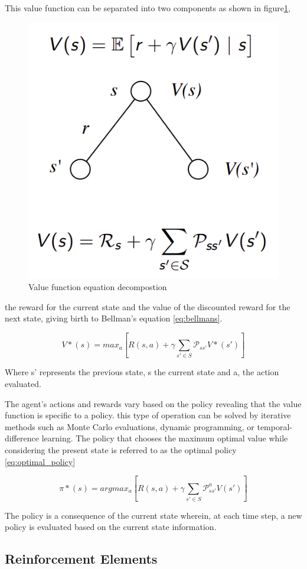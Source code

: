 This value function can be separated into two components as shown in figure\ref{fig:bellman}, 

\begin{figure}[!h]
    \centering
    \includegraphics[width=.4\textwidth]{fig/rl/Bellmans decomposition.png}
    \caption{Value function equation decompostion}
    \label{fig:bellman}
\end{figure}

the reward for the current state and the value of the discounted reward for the next state, giving birth to Bellman's equation \ref{eq:bellmans}.

\begin{equation}
    \label{eq:bellmans}
    V*(s) = max_a[ R(s,a) + \gamma \sum_{s' \in S}\mathcal{P}_{ss'} V*(s')]
\end{equation}

Where s' represents the previous state, s the current state and a, the action evaluated.

The agent's actions and rewards vary based on the policy revealing that the value function is specific to a policy. this type of operation can be solved by iterative methods such as Monte Carlo evaluations, dynamic programming, or temporal-difference learning. The policy that chooses the maximum optimal value while considering the present state is referred to as the optimal policy \ref{eq:optimal_policy}

\begin{equation}
    \label{eq:optimal_policy}
    \pi*(s) = argmax_a[R(s,a) + \gamma \sum_{s' \in S}\mathcal{P}_{ss'}^a V(s')]
\end{equation}

The policy is a consequence of the current state wherein, at each time step, a new policy is evaluated based on the current state information.

\subsection*{Reinforcement Elements}

